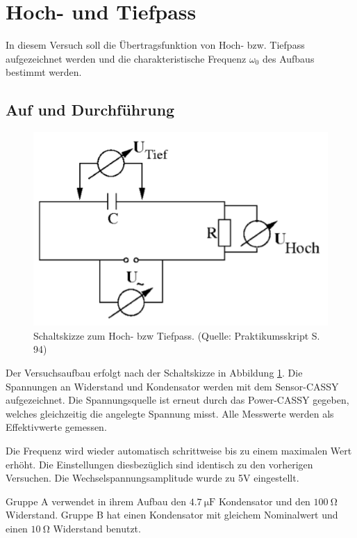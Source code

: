 \documentclass[12pt,a4paper]{article}
\begin{document}
\newpage
\section{Hoch- und Tiefpass}

In diesem Versuch soll die Übertragsfunktion von Hoch- bzw. Tiefpass aufgezeichnet werden und die charakteristische Frequenz $\omega_0$ des Aufbaus bestimmt werden.

\subsection{Auf und Durchführung}

\begin{figure}
\centering
\includegraphics[scale=1.0]{Bilder/AufbauHochTief.png}
\caption{Schaltskizze zum Hoch- bzw Tiefpass. (Quelle: Praktikumsskript S. 94)}
\label{fig:AufbauHochTief}
\end{figure}

Der Versuchsaufbau erfolgt nach der Schaltskizze in Abbildung \ref{fig:AufbauHochTief}. Die Spannungen an Widerstand und Kondensator
werden mit dem Sensor-CASSY aufgezeichnet. Die Spannungsquelle ist erneut durch das Power-CASSY gegeben, welches gleichzeitig die angelegte Spannung misst. Alle Messwerte werden als Effektivwerte gemessen.

Die Frequenz wird wieder automatisch schrittweise bis zu einem maximalen Wert erhöht. Die Einstellungen diesbezüglich sind identisch zu den vorherigen Versuchen. Die Wechselspannungsamplitude wurde zu 5V eingestellt.

Gruppe A verwendet in ihrem Aufbau den $\SI{4,7}{\micro \F}$ Kondensator und den $\SI{100}{\ohm}$ Widerstand. Gruppe B hat einen Kondensator mit gleichem Nominalwert und einen $\SI{10}{\ohm}$ Widerstand benutzt.
\end{document}
